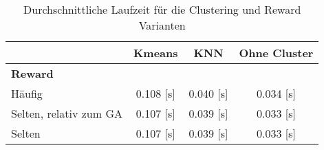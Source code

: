 \begin{table}[ht]
\caption{Durchschnittliche Laufzeit für die Clustering und Reward Varianten}
\centering
\label{tab:zeiten_testing}
\begin{tabular}{lccc}
\hline
\textbf{} & \textbf{Kmeans} & \textbf{KNN} & \textbf{Ohne Cluster} \\
\hline
\multicolumn{4}{l}{\textbf{Reward}} \\
\hspace{1em}Häufig & 0.108 [s] & 0.040 [s] & 0.034 [s] \\
\hspace{1em}Selten, relativ zum GA & 0.107 [s] & 0.039 [s] & 0.033 [s] \\
\hspace{1em}Selten & 0.107 [s] & 0.039 [s] & 0.033 [s] \\
\hline
\end{tabular}
\end{table}
